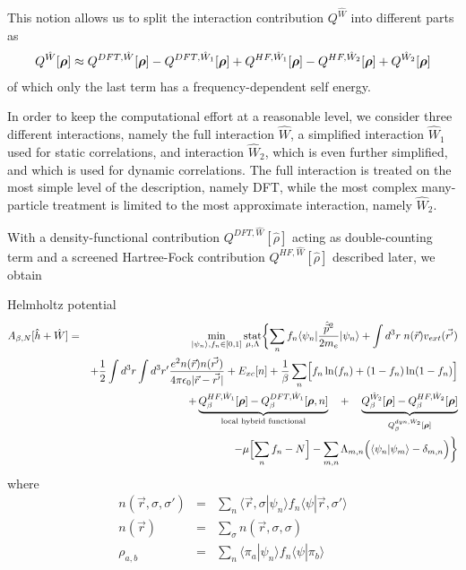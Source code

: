 \documentclass[11pt,a4paper]{report}
\begin{document}
This notion allows us to split the interaction contribution
$Q^{\hat{W}}$ into different parts as
\begin{eqnarray}
Q^{\hat{W}}[\bm{\rho}]
\approx Q^{DFT,\hat{W}}[\bm{\rho}]-Q^{DFT,\hat{W}_1}[\bm{\rho}]
+Q^{HF,\hat{W}_1}[\bm{\rho}]-Q^{HF,\hat{W}_2}[\bm{\rho}]
+Q^{\hat{W}_2}[\bm{\rho}]
\end{eqnarray}
of which only the last term has a frequency-dependent self energy.

In order to keep the computational effort at a reasonable level, we
consider three different interactions, namely the full interaction
$\hat{W}$, a simplified interaction $\hat{W}_1$ used for static
correlations, and interaction $\hat{W}_2$, which is even further
simplified, and which is used for dynamic correlations.
The full interaction is treated on the most simple level of the
description, namely DFT, while the most complex many-particle
treatment is limited to the most approximate interaction, namely
$\hat{W}_2$. 

With a density-functional contribution $Q^{DFT,\hat{W}}[\hat{\rho}]$
acting as double-counting term and a screened Hartree-Fock
contribution $Q^{HF,\hat{W}}[\hat{\rho}]$ described later, we obtain
\begin{myshadowminipage}{Helmholtz potential}
\begin{eqnarray}
A_{\beta,N}[\hat{h}+\hat{W}]
&=&\min_{|\psi_n\rangle,f_n\in[0,1]}\operatorname*{stat}_{\mu,\Lambda}
\biggl\lbrace
\sum_n f_n\langle\psi_n|\frac{\hat{\vec{p}}^2}{2m_e}|\psi_n\rangle
+\int d^3r\;n(\vec{r})v_{ext}(\vec{r'})
\nonumber\\
&&+\frac{1}{2}\int d^3r\int d^3r'
\frac{e^2n(\vec{r})n(\vec{r'})}{4\pi\epsilon_0|\vec{r}-\vec{r'}|}
+E_{xc}[n]
+\frac{1}{\beta}\sum_n\Bigl[f_n\ln(f_n)+(1-f_n)\ln(1-f_n)\Bigr]
\nonumber\\
&&+
\underbrace{Q_{\beta}^{HF,\hat{W}_1}[\bm{\rho}]
   -Q_{\beta}^{DFT,\hat{W}_1}[\bm{\rho},n]}_{\text{local hybrid functional}}
\quad+\quad
\underbrace{Q_{\beta}^{\hat{W}_2}[\bm{\rho}]
-Q_{\beta}^{HF,\hat{W}_2}[\bm{\rho}]}
_{Q_{\beta}^{dyn,\hat{W}_2}[\bm{\rho}]}
\nonumber\\
&&
-\mu\Bigl[\sum_n f_n-N\Bigr]
-\sum_{m,n}\Lambda_{m,n}\Bigl(\langle\psi_n|\psi_m\rangle-\delta_{m,n}\Bigr)
\biggr\rbrace
\label{eq:hp}
\end{eqnarray}
where 
\begin{eqnarray}
n(\vec{r},\sigma,\sigma')&=&
\sum_n\langle\vec{r},\sigma|\psi_n\rangle 
f_n\langle\psi|\vec{r},\sigma'\rangle 
\nonumber\\
n(\vec{r})&=&\sum_\sigma n(\vec{r},\sigma,\sigma)
\nonumber\\
\rho_{a,b}&=&\sum_n\langle\pi_a|\psi_n\rangle 
f_n\langle\psi|\pi_b\rangle 
\label{eq:denmatmatel}
\end{eqnarray}
\end{myshadowminipage}
\end{document}
